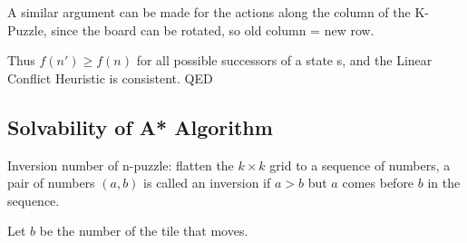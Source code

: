 \documentclass{llncs}
\begin{document}
A similar argument can be made for the actions along the column of the K-Puzzle, since the board can be rotated, so old column = new row.

Thus $f(n') \geq f(n)$ for all possible successors of a state s, and the Linear Conflict Heuristic is consistent. QED

\subsection{Solvability of A* Algorithm}
\begin{definition}
Inversion number of n-puzzle: flatten the $k \times k$ grid to a sequence of numbers, a pair of numbers $(a,b)$ is called an inversion if $a>b$ but $a$ comes before $b$ in the sequence.
\end{definition}
Let $b$ be the number of the tile that moves.
\end{document}
